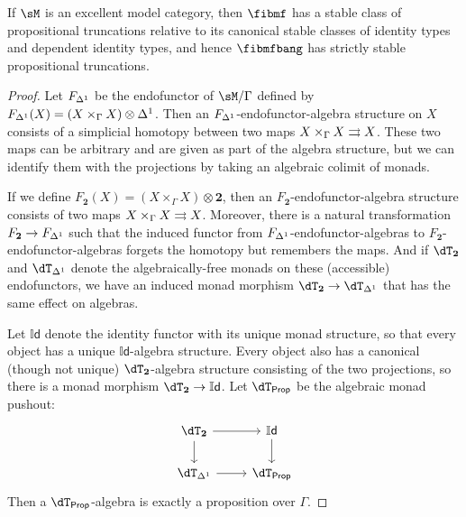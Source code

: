 \documentclass{amsart}
\def\dId{\mathbb{I}\mathsf{d}}
\def\dtprop{\dT_{\mathsf{Prop}}}
\def\tr{\mathsf{tr}}
\def\treq{\mathsf{treq}}
\begin{document}
\begin{thm}
  If $\sM$ is an excellent model category, then $\fibmf$ has a stable class of propositional truncations relative to its canonical stable classes of identity types and dependent identity types, and hence $\fibmfbang$ has strictly stable propositional truncations.
\end{thm}
\begin{proof}
  Let $F_{{\Delta^1}}$ be the endofunctor of $\sM/\Gamma$ defined by $F_{{\Delta^1}}(X) = (X \times_\Gamma X) \otimes {\Delta^1}$.
  Then an $F_{{\Delta^1}}$-endofunctor-algebra structure on $X$ consists of a simplicial homotopy between two maps $X \times_\Gamma X \rightrightarrows X$.
  These two maps can be arbitrary and are given as part of the algebra structure, but we can identify them with the projections by taking an algebraic colimit of monads.

  If we define $F_{\mathbf{2}}(X) = (X\times_\Gamma X) \otimes \mathbf{2}$, then an $F_{\mathbf{2}}$-endofunctor-algebra structure consists of two maps $X \times_\Gamma X \rightrightarrows X$.
  Moreover, there is a natural transformation $F_{\mathbf{2}} \to F_{\Delta^1}$ such that the induced functor from $F_{{\Delta^1}}$-endofunctor-algebras to $F_{\mathbf{2}}$-endofunctor-algebras forgets the homotopy but remembers the maps.
  And if $\dT_{\mathbf{2}}$ and $\dT_\ivl$ denote the algebraically-free monads on these (accessible) endofunctors, we have an induced monad morphism $\dT_{\mathbf{2}} \to \dT_\ivl$ that has the same effect on algebras.

  Let $\dId$ denote the identity functor with its unique monad structure, so that every object has a unique $\dId$-algebra structure.
  Every object also has a canonical (though not unique) $\dT_{\mathbf{2}}$-algebra structure consisting of the two projections, so there is a monad morphism $\dT_{\mathbf{2}} \to \dId$.
  Let $\dtprop$ be the algebraic monad pushout:
  \[
  \begin{tikzcd}
    \dT_{\mathbf{2}} \ar[r] \ar[d] & \dId \ar[d] \\ \dT_{\ivl} \ar[r] & \dtprop
  \end{tikzcd}
  \]
  Then a $\dtprop$-algebra is exactly a proposition over $\Gamma$.


\end{proof}
\end{document}
